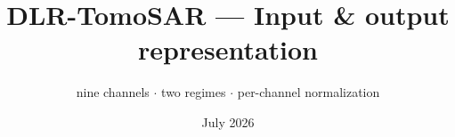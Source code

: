 \documentclass[aspectratio=169,9pt]{beamer}
\title{\textbf{DLR-TomoSAR --- Input \& output representation}}
\subtitle{nine channels \; $\cdot$ \; two regimes \; $\cdot$ \; per-channel normalization}
\date{\small July 2026}
\author{}
\begin{document}
\begin{frame}[plain]
  \titlepage
\end{frame}


\end{document}
